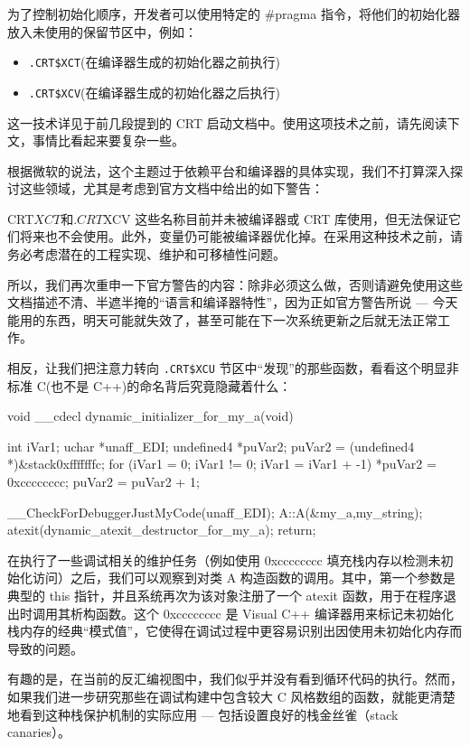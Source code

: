 为了控制初始化顺序，开发者可以使用特定的 \#pragma 指令，将他们的初始化器放入未使用的保留节区中，例如：

\begin{itemize}
\item 
\verb|.CRT$XCT|(在编译器生成的初始化器之前执行)

\item 
\verb|.CRT$XCV|(在编译器生成的初始化器之后执行)
\end{itemize}

这一技术详见于前几段提到的 CRT 启动文档中。使用这项技术之前，请先阅读下文，事情比看起来要复杂一些。

根据微软的说法，这个主题过于依赖平台和编译器的具体实现，我们不打算深入探讨这些领域，尤其是考虑到官方文档中给出的如下警告：

\begin{shell}
CRT$XCT和.CRT$XCV 这些名称目前并未被编译器或 CRT 库使用，但无法保证它们将来也不会使用。此外，变量仍可能被编译器优化掉。在采用这种技术之前，请务必考虑潜在的工程实现、维护和可移植性问题。
\end{shell}

所以，我们再次重申一下官方警告的内容：除非必须这么做，否则请避免使用这些文档描述不清、半遮半掩的“语言和编译器特性”，因为正如官方警告所说 --- 今天能用的东西，明天可能就失效了，甚至可能在下一次系统更新之后就无法正常工作。

相反，让我们把注意力转向 \verb|.CRT$XCU| 节区中“发现”的那些函数，看看这个明显非标准 C(也不是 C++)的命名背后究竟隐藏着什么：

\begin{cpp}
void __cdecl dynamic_initializer_for_my_a(void)
{
  int iVar1;
  uchar *unaff_EDI;
  undefined4 *puVar2;
  puVar2 = (undefined4 *)&stack0xfffffffc;
  for (iVar1 = 0; iVar1 != 0; iVar1 = iVar1 + -1) {
  *puVar2 = 0xcccccccc;
  puVar2 = puVar2 + 1;
}

__CheckForDebuggerJustMyCode(unaff_EDI);
  A::A(&my_a,my_string);
  atexit(dynamic_atexit_destructor_for_my_a);
  return;
}
\end{cpp}

在执行了一些调试相关的维护任务（例如使用 0xcccccccc 填充栈内存以检测未初始化访问）之后，我们可以观察到对类 A 构造函数的调用。其中，第一个参数是典型的 this 指针，并且系统再次为该对象注册了一个 atexit 函数，用于在程序退出时调用其析构函数。这个 0xcccccccc 是 Visual C++ 编译器用来标记未初始化栈内存的经典“模式值”，它使得在调试过程中更容易识别出因使用未初始化内存而导致的问题。

有趣的是，在当前的反汇编视图中，我们似乎并没有看到循环代码的执行。然而，如果我们进一步研究那些在调试构建中包含较大 C 风格数组的函数，就能更清楚地看到这种栈保护机制的实际应用 --- 包括设置良好的栈金丝雀（stack canaries）。

